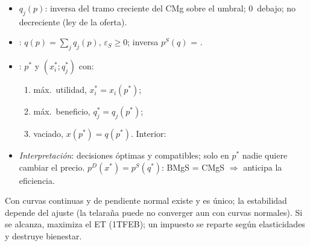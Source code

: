 \documentclass{article}
\begin{document}
\begin{columnas}
\begin{itemize}
  \begin{itemize}
  \item Sin hundidos, mín.\ CMe; con hundidos (CP), mín.\ CVMe; CMe en U $\Rightarrow$ la oferta salta de 0~a la  $\overline{q}_j$ en $\overline{c}_j=\min\mathrm{CMe}_j$.
  \end{itemize}
\item {} $q_j(p)$: inversa del tramo creciente del CMg sobre el umbral; 0~debajo; no decreciente (ley de la oferta).
\item {}: $q(p)=\sum_jq_j(p)$, $\varepsilon_S\geq0$; inversa $p^S(q)$ = .
\end{itemize}
\begin{itemize}
\item {}: $p^*$ y $(x_i^*;q_j^*)$ con:
  \begin{enumerate}
  \item máx.\ utilidad, $x_i^*=x_i(p^*)$;
  \item máx.\ beneficio, $q_j^*=q_j(p^*)$;
  \item vaciado, $x(p^*)=q(p^*)$. Interior:
  \end{enumerate}
\item \emph{Interpretación}: decisiones óptimas y compatibles; solo en $p^*$ nadie quiere cambiar el precio.
  $p^D(x^*)=p^S(q^*)$: BMgS = CMgS $\Rightarrow$ anticipa la eficiencia.
\end{itemize}

\begin{ideaclave}
Con curvas continuas y de pendiente normal existe y es único; la estabilidad depende del ajuste (la telaraña puede no converger aun con curvas normales). Si se alcanza, maximiza el ET (1TFEB); un impuesto se reparte según elasticidades y destruye bienestar.
\end{ideaclave}


\end{columnas}
\end{document}
